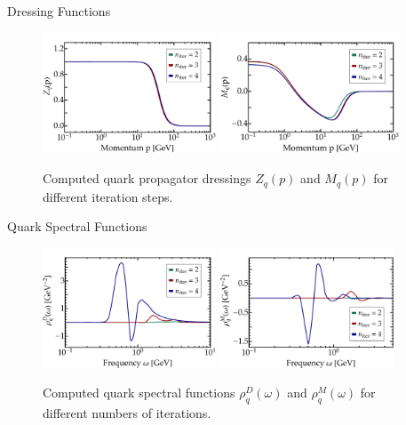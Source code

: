 \begin{frame}{Dressing Functions}
	\addtocounter{framenumber}{-1}
	 \begin{figure}[t] 
\hfill
	\centering
	\includegraphics[width = 0.46\textwidth, trim= 4em 0 0 0]{figs/plots/ZqPlot}
\hfill
	\includegraphics[width = 0.475\textwidth, trim= 4em 0 0 0]{figs/plots/MqPlot}
\hfill
	\caption[Computed quark propagator dressings $Z_q(p)$ and $M_q(p)$.]{Computed quark propagator dressings $Z_q(p)$ and $M_q(p)$ for different iteration steps.}
\label{fig:computed_dressings}
\end{figure}
\end{frame}

\begin{frame}{Quark Spectral Functions}
	 \begin{figure}[t] 
\hfill
	\centering
	\includegraphics[width = 0.46\textwidth, trim= 4em 0 0 0]{figs/plots/rhoqDPlot}
\hfill
	\includegraphics[width = 0.46\textwidth, trim= 4em 0 0 0 0]{figs/plots/rhoqMPlot}
\hfill 
	\caption{Computed quark spectral functions $\rho_q^D(\omega)$ and $\rho_q^M(\omega)$ for different numbers of iterations.
	}
\label{fig:specfunc_results}
\end{figure}

\end{frame}


